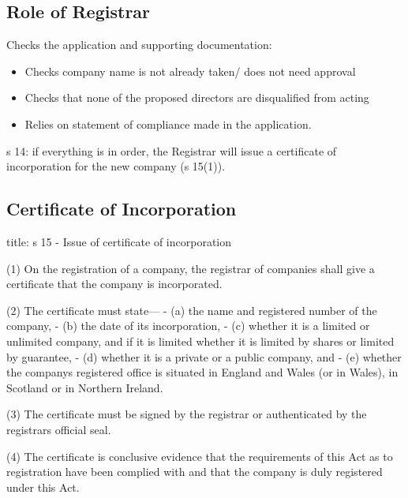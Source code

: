 \documentclass[
]{article}
\newenvironment{Shaded}{}{}
\newcommand{\NormalTok}[1]{#1}
\providecommand{\tightlist}{%
  \setlength{\itemsep}{0pt}\setlength{\parskip}{0pt}}
\begin{document}
\hypertarget{role-of-registrar}{%
\subsection{Role of Registrar}\label{role-of-registrar}}

Checks the application and supporting documentation:

\begin{itemize}
\tightlist
\item
  Checks company name is not already taken/ does not need approval
\item
  Checks that none of the proposed directors are disqualified from
  acting
\item
  Relies on statement of compliance made in the application.
\end{itemize}

s 14: if everything is in order, the Registrar will issue a certificate
of incorporation for the new company (s 15(1)).

\hypertarget{certificate-of-incorporation}{%
\subsection{Certificate of
Incorporation}\label{certificate-of-incorporation}}

\begin{Shaded}
\begin{Highlighting}[]
\NormalTok{title: s 15 {-} Issue of certificate of incorporation}

\NormalTok{(1) On the registration of a company, the registrar of companies shall give a certificate that the company is incorporated.}

\NormalTok{(2) The certificate must state—}
\NormalTok{{-} (a) the name and registered number of the company,}
\NormalTok{{-} (b) the date of its incorporation,}
\NormalTok{{-} (c) whether it is a limited or unlimited company, and if it is limited whether it is limited by shares or limited by guarantee,}
\NormalTok{{-} (d) whether it is a private or a public company, and}
\NormalTok{{-} (e) whether the company\textquotesingle{}s registered office is situated in England and Wales (or in Wales), in Scotland or in Northern Ireland.}

\NormalTok{(3) The certificate must be signed by the registrar or authenticated by the registrar\textquotesingle{}s official seal.}

\NormalTok{(4) The certificate is conclusive evidence that the requirements of this Act as to registration have been complied with and that the company is duly registered under this Act.}
\end{Highlighting}
\end{Shaded}
\end{document}
